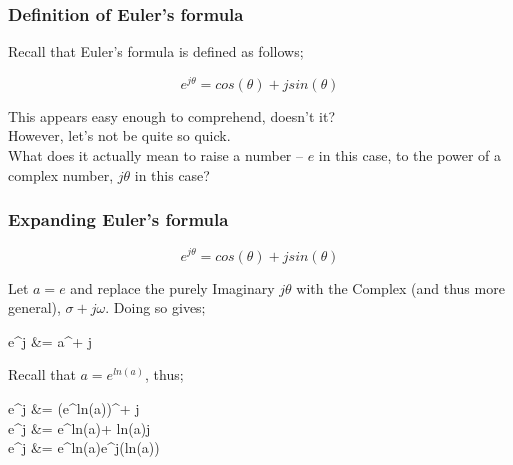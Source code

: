 \documentclass[aspectratio=169, final]{beamer}
\begin{document}

\begin{frame}[t]

	\frametitle{Definition of Euler's formula}

	Recall that Euler's formula is defined as follows;

	\begin{equation} \label{eqn_frame_1_a}
	e^{j\theta} = cos(\theta) + jsin(\theta)
	\end{equation}

	This appears easy enough to comprehend, doesn't it?\\

	However, let's not be quite so quick.\\

	What does it actually mean to raise a number -- \(e\) in this case, to the power of a complex number, \(j\theta\) in this case?

\end{frame}



\begin{frame}[t]

	\frametitle{Expanding Euler's formula}

	\begin{equation} \label{eqn_frame_2_a}
	e^{j\theta} = cos(\theta) + jsin(\theta)
	\end{equation}

	Let \(a = e\) and replace the purely Imaginary \(j\theta\) with the Complex (and thus more general), \(\sigma + j\omega\). Doing so gives;

	\begin{flalign} \label{eqn_frame_2_b}
	e^{j\theta} &= a^{\sigma + j\omega}
	\end{flalign}

	Recall that \(a = e^{ln(a)}\), thus;

	\begin{flalign} \label{eqn_frame_2_c}
	e^{j\theta} &= (e^{ln(a)})^{\sigma + j\omega} \\
	e^{j\theta} &= e^{ln(a)\sigma + ln(a)j\omega} \\
	e^{j\theta} &= e^{ln(a)\sigma}e^{j(ln(a)\omega)}
	\end{flalign}

\end{frame}


\end{document}
